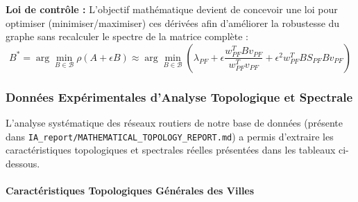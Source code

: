\documentclass[11pt, a4paper]{article}
\begin{document}
\textbf{Loi de contrôle :} L'objectif mathématique devient de concevoir
une loi pour optimiser (minimiser/maximiser) ces dérivées afin
d'améliorer la robustesse du graphe sans recalculer le spectre de la
matrice complète :
\[B^* = \arg\min_{B \in \mathcal{B}} \rho(A + \epsilon B) \approx \arg\min_{B \in \mathcal{B}} \left( \lambda_{PF} + \epsilon \frac{w_{PF}^T B v_{PF}}{w_{PF}^T v_{PF}} + \epsilon^2 w_{PF}^T B S_{PF} B v_{PF} \right)\]

\subsubsection{Données Expérimentales d'Analyse Topologique et
Spectrale}\label{donnuxe9es-expuxe9rimentales-danalyse-topologique-et-spectrale}

L'analyse systématique des réseaux routiers de notre base de données
(présente dans \texttt{IA\_report/MATHEMATICAL\_TOPOLOGY\_REPORT.md}) a
permis d'extraire les caractéristiques topologiques et spectrales
réelles présentées dans les tableaux ci-dessous.

\paragraph{Caractéristiques Topologiques Générales des
Villes}\label{caractuxe9ristiques-topologiques-guxe9nuxe9rales-des-villes}
\end{document}
